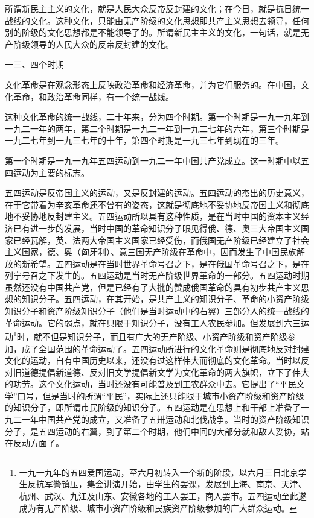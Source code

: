 \documentclass[UTF8, 12pt, a4paper]{ctexrep}
\begin{document}
所谓新民主主义的文化，就是人民大众反帝反封建的文化；在今日，就是抗日统一战线的文化。这种文化，只能由无产阶级的文化思想即共产主义思想去领导，任何别的阶级的文化思想都是不能领导了的。所谓新民主主义的文化，一句话，就是无产阶级领导的人民大众的反帝反封建的文化。

一三、四个时期

文化革命是在观念形态上反映政治革命和经济革命，并为它们服务的。在中国，文化革命，和政治革命同样，有一个统一战线。

这种文化革命的统一战线，二十年来，分为四个时期。第一个时期是一九一九年到一九二一年的两年，第二个时期是一九二一年到一九二七年的六年，第三个时期是一九二七年到一九三七年的十年，第四个时期是一九三七年到现在的三年。

第一个时期是一九一九年五四运动到一九二一年中国共产党成立。这一时期中以五四运动为主要的标志。

五四运动是反帝国主义的运动，又是反封建的运动。五四运动的杰出的历史意义，在于它带着为辛亥革命还不曾有的姿态，这就是彻底地不妥协地反帝国主义和彻底地不妥协地反封建主义。五四运动所以具有这种性质，是在当时中国的资本主义经济已有进一步的发展，当时中国的革命知识分子眼见得俄、德、奥三大帝国主义国家已经瓦解，英、法两大帝国主义国家已经受伤，而俄国无产阶级已经建立了社会主义国家，德、奥（匈牙利）、意三国无产阶级在革命中，因而发生了中国民族解放的新希望。五四运动是在当时世界革命号召之下，是在俄国革命号召之下，是在列宁号召之下发生的。五四运动是当时无产阶级世界革命的一部分。五四运动时期虽然还没有中国共产党，但是已经有了大批的赞成俄国革命的具有初步共产主义思想的知识分子。五四运动，在其开始，是共产主义的知识分子、革命的小资产阶级知识分子和资产阶级知识分子（他们是当时运动中的右翼）三部分人的统一战线的革命运动。它的弱点，就在只限于知识分子，没有工人农民参加。但发展到六三运动\footnote{一九一九年的五四爱国运动，至六月初转入一个新的阶段，以六月三日北京学生反抗军警镇压，集会讲演开始，由学生的罢课，发展到上海、南京、天津、杭州、武汉、九江及山东、安徽各地的工人罢工，商人罢市。五四运动至此遂成为有无产阶级、城市小资产阶级和民族资产阶级参加的广大群众运动。}时，就不但是知识分子，而且有广大的无产阶级、小资产阶级和资产阶级参加，成了全国范围的革命运动了。五四运动所进行的文化革命则是彻底地反对封建文化的运动，自有中国历史以来，还没有过这样伟大而彻底的文化革命。当时以反对旧道德提倡新道德、反对旧文学提倡新文学为文化革命的两大旗帜，立下了伟大的功劳。这个文化运动，当时还没有可能普及到工农群众中去。它提出了“平民文学”口号，但是当时的所谓“平民”，实际上还只能限于城市小资产阶级和资产阶级的知识分子，即所谓市民阶级的知识分子。五四运动是在思想上和干部上准备了一九二一年中国共产党的成立，又准备了五卅运动和北伐战争。当时的资产阶级知识分子，是五四运动的右翼，到了第二个时期，他们中间的大部分就和敌人妥协，站在反动方面了。
\end{document}
